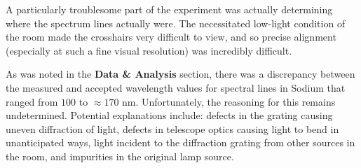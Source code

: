 \documentclass[paper=a4, fontsize=11pt]{scrartcl} %
\numberwithin{equation}{section}
\numberwithin{figure}{section}
\numberwithin{table}{section}
\begin{document}
A particularly troublesome part of the experiment was actually determining where the spectrum lines actually were. The necessitated low-light condition of the room made the crosshairs very difficult to view, and so precise alignment (especially at such a fine visual resolution) was incredibly difficult.

As was noted in the \textbf{Data \& Analysis} section, there was a discrepancy between the measured and accepted wavelength values for spectral lines in Sodium that ranged from $100$ to $\approx 170$ nm. Unfortunately, the reasoning for this remains undetermined. Potential explanations include: defects in the grating causing uneven diffraction of light, defects in telescope optics causing light to bend in unanticipated ways, light incident to the diffraction grating from other sources in the room, and impurities in the original lamp source.
\end{document}

